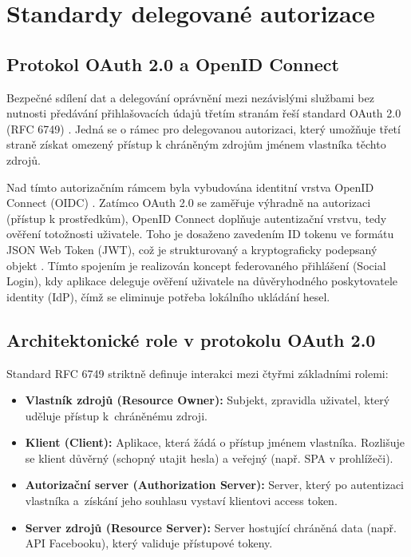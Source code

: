 \documentclass[male,czech,api_bc]{kitheses}
\begin{document}
\section{Standardy delegované autorizace}

\subsection{Protokol OAuth 2.0 a OpenID Connect}

Bezpečné sdílení dat a delegování oprávnění mezi nezávislými službami bez nutnosti předávání přihlašovacích údajů třetím stranám řeší standard OAuth 2.0 (RFC 6749) \cite{Hardt2012}. Jedná se o rámec pro delegovanou autorizaci, který umožňuje třetí straně získat omezený přístup k chráněným zdrojům jménem vlastníka těchto zdrojů.

Nad tímto autorizačním rámcem byla vybudována identitní vrstva OpenID Connect (OIDC) \cite{Sakimura2023}. Zatímco OAuth 2.0 se zaměřuje výhradně na autorizaci (přístup k prostředkům), OpenID Connect doplňuje autentizační vrstvu, tedy ověření totožnosti uživatele. Toho je dosaženo zavedením ID tokenu ve formátu JSON Web Token (JWT), což je strukturovaný a kryptograficky podepsaný objekt \cite{Jones2015}. Tímto spojením je realizován koncept federovaného přihlášení (Social Login), kdy aplikace deleguje ověření uživatele na důvěryhodného poskytovatele identity (IdP), čímž se eliminuje potřeba lokálního ukládání hesel.

\subsection{Architektonické role v protokolu OAuth 2.0}

Standard RFC 6749 \cite{Hardt2012} striktně definuje interakci mezi čtyřmi základními rolemi:
\begin{itemize}
\item \textbf{Vlastník zdrojů (Resource Owner):} Subjekt, zpravidla uživatel, který uděluje přístup k~chráněnému zdroji.
\item \textbf{Klient (Client):} Aplikace, která žádá o přístup jménem vlastníka. Rozlišuje se klient důvěrný (schopný utajit hesla) a veřejný (např. SPA v prohlížeči).
\item \textbf{Autorizační server (Authorization Server):} Server, který po autentizaci vlastníka a~získání jeho souhlasu vystaví klientovi access token.
\item \textbf{Server zdrojů (Resource Server):} Server hostující chráněná data (např. API Facebooku), který validuje přístupové tokeny.
\end{itemize}
\end{document}
